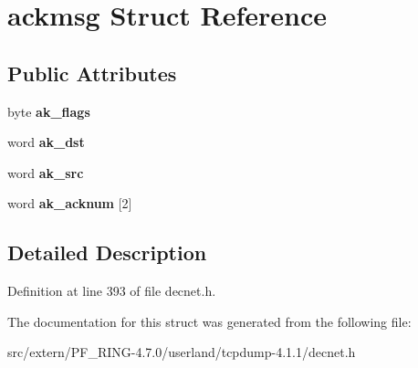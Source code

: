 \hypertarget{structackmsg}{
\section{ackmsg Struct Reference}
\label{structackmsg}
}
\subsection*{Public Attributes}
\begin{DoxyCompactItemize}
\item 
\hypertarget{structackmsg_a5ae25dd3d6726883fe4660492c31635d}{
byte {\bfseries ak\_\-flags}}
\label{structackmsg_a5ae25dd3d6726883fe4660492c31635d}

\item 
\hypertarget{structackmsg_a1eb3f65a102b1511c6709caff26eba59}{
word {\bfseries ak\_\-dst}}
\label{structackmsg_a1eb3f65a102b1511c6709caff26eba59}

\item 
\hypertarget{structackmsg_a252e71d55f7de99e00a7c9875c2e452d}{
word {\bfseries ak\_\-src}}
\label{structackmsg_a252e71d55f7de99e00a7c9875c2e452d}

\item 
\hypertarget{structackmsg_ae481c3bba86a6018d3c82ff0bfbb0ac3}{
word {\bfseries ak\_\-acknum} \mbox{[}2\mbox{]}}
\label{structackmsg_ae481c3bba86a6018d3c82ff0bfbb0ac3}

\end{DoxyCompactItemize}


\subsection{Detailed Description}


Definition at line 393 of file decnet.h.



The documentation for this struct was generated from the following file:\begin{DoxyCompactItemize}
\item 
src/extern/PF\_\-RING-\/4.7.0/userland/tcpdump-\/4.1.1/decnet.h\end{DoxyCompactItemize}

